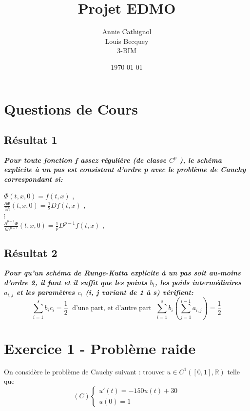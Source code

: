 \documentclass[a4paper,12pt,landscape]{article}
\begin{document}
\title{Projet EDMO}
\author{Annie Cathignol\\Louis Becquey\\3-BIM}
\date{\today}
\maketitle
\newpage

\section{Questions de Cours}
\subsection{Résultat 1}
{\it \bf Pour toute fonction f assez régulière (de classe $C^{p}$ ), le schéma explicite à un pas est consistant d’ordre p avec le problème de Cauchy correspondant si:}\\
\begin{center}
$\Phi (t,x,0) = f(t,x)$ ,  \\
$\frac{\partial \Phi}{\partial h} (t,x,0) = \frac{1}{2}Df(t,x)$ , \\
$\vdots$ \\
$\frac{\partial^{p-1}\Phi}{\partial h^{p-1}} (t,x,0) = \frac{1}{p}D^{p-1}f(t,x)$ , \\
\end{center}


\subsection{Résultat 2}
{\it \bf Pour qu’un schéma de Runge-Kutta explicite à un pas soit au-moins d’ordre 2, il faut et il suffit que les points $b_{i}$, les poids intermédiaires $a_{i,j}$ et les paramètres $c_{i}$ (i, j variant de 1 à s) vérifient:} $$\sum_{i=1}^{s}b_{i}c_{i} = \frac{1}{2} \; \textrm{   d'une part, et d'autre part   } \; \sum_{i=1}^{s}b_{i}(\sum_{j=1}^{i-1}a_{i,j})= \frac{1}{2}$$


\section{Exercice 1 - Problème raide}
On considère le problème de Cauchy suivant :
trouver $u \in C^{1}([0,1], \mathbb{R} )$ telle que
$$
(C) \left \{
\begin{array}{l}
	u'(t)= -150u(t) + 30 \\
	u(0) = 1
\end{array}
\right.
$$
\newpage
\end{document}
